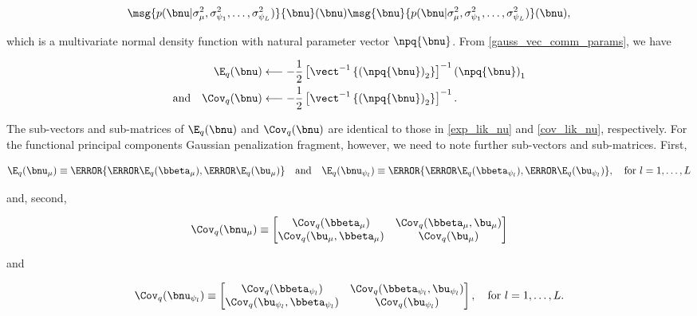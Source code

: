 \documentclass[12pt]{article}
\def\sigsqmu{\sigma^2_{\mu}}
\def\betamu{\bbeta_\mu}
\def\umu{\bu_\mu}
\def\numu{\bnu_\mu}
\newcommand\betapsi[1]{\bbeta_{\psi_{#1}}}
\newcommand\upsi[1]{\bu_{\psi_{#1}}}
\newcommand\nupsi[1]{\bnu_{\psi_{#1}}}
\newcommand\sigsqpsi[1]{\sigma^2_{\psi_{#1}}}
\theoremstyle{plain}
\theoremstyle{definition}
\theoremstyle{remark}
\begin{document}
\[
	\msg{p(\bnu | \sigsqmu, \sigsqpsi{1}, \dots, \sigsqpsi{L})}{\bnu} (\bnu)
	\msg{\bnu}{p(\bnu | \sigsqmu, \sigsqpsi{1}, \dots, \sigsqpsi{L})} (\bnu),
\]

\noindent which is a multivariate normal density function with natural parameter vector $\npq{\bnu}$.
From \eqref{gauss_vec_comm_params}, we have

\begin{align}
\begin{split}
	\E_q (\bnu)
		&\longleftarrow
			-\frac12 \left[
				\vect^{-1} \left\{
					\left( \npq{\bnu} \right)_2
				\right\}
			\right]^{-1} \left( \npq{\bnu} \right)_1 \\
	\text{and} \quad
	\Cov_q (\bnu)
		&\longleftarrow
			-\frac12 \left[
				\vect^{-1} \left\{
					\left( \npq{\bnu} \right)_2
				\right\}
			\right]^{-1}.
\end{split}
\label{mom_pen_nu}
\end{align}

\noindent The sub-vectors and sub-matrices of $\E_q (\bnu)$ and $\Cov_q (\bnu)$ are identical to those in
\eqref{exp_lik_nu} and \eqref{cov_lik_nu}, respectively. For the functional principal components Gaussian penalization fragment,
however, we need to note further sub-vectors and sub-matrices. First,

\begin{equation}
	\E_q (\numu) \equiv \T{\left\{ \T{\E_q (\betamu)}, \T{\E_q (\umu)} \right\}} \quad
	\text{and} \quad
	\E_q (\nupsi{l}) \equiv \T{\left\{ \T{\E_q (\betapsi{l})}, \T{\E_q (\upsi{l})} \right\}}, \quad
	\text{for $l = 1, \dots, L$}
\label{exp_betau}
\end{equation}

\noindent and, second,

\begin{equation}
	\Cov_q (\numu) \equiv \begin{bmatrix}
		\Cov_q (\betamu) & \Cov_q (\betamu, \umu) \\
		\Cov_q (\umu, \betamu) & \Cov_q (\umu)
	\end{bmatrix}
\label{cov_betau_mu}
\end{equation}

\noindent and

\begin{equation}
	\Cov_q (\nupsi{l}) \equiv \begin{bmatrix}
		\Cov_q (\betapsi{l}) & \Cov_q (\betapsi{l}, \upsi{l}) \\
		\Cov_q (\upsi{l}, \betapsi{l}) & \Cov_q (\upsi{l})
	\end{bmatrix}, \quad
	\text{for $l = 1, \dots, L$.}
\label{cov_betau_psi}
\end{equation}
\end{document}
